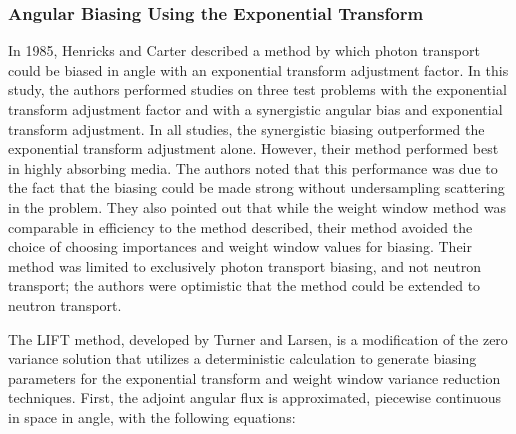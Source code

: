 %
%

\subsubsection{Angular Biasing Using the Exponential Transform}

In 1985, Henricks and Carter \cite{hendricks_anisotropic_1985} described a method by which
photon transport could be biased in angle with an exponential transform adjustment factor.
In this study, the authors performed studies on three test problems with the exponential
transform adjustment factor and with a synergistic angular bias and exponential transform
adjustment.
In all studies, the synergistic biasing outperformed the exponential transform adjustment
alone.
However, their method performed best in highly absorbing media.
The authors noted that this performance was due to the fact that the biasing could be made
strong without undersampling scattering in the problem.
They also pointed out that while the weight window method was comparable in efficiency to the
method described, their method avoided the choice of choosing importances and weight window
values for biasing. Their method was limited to exclusively photon transport biasing, and not
neutron transport; the authors were optimistic that the method could be extended to neutron
transport.

The LIFT \cite{turner_automatic_1997} method, developed by Turner and Larsen, is a modification
of the zero variance solution that utilizes a deterministic calculation to generate biasing
parameters for the exponential transform and weight window variance reduction techniques.
First, the adjoint angular flux is approximated, piecewise continuous in space in angle,
with the following equations:

